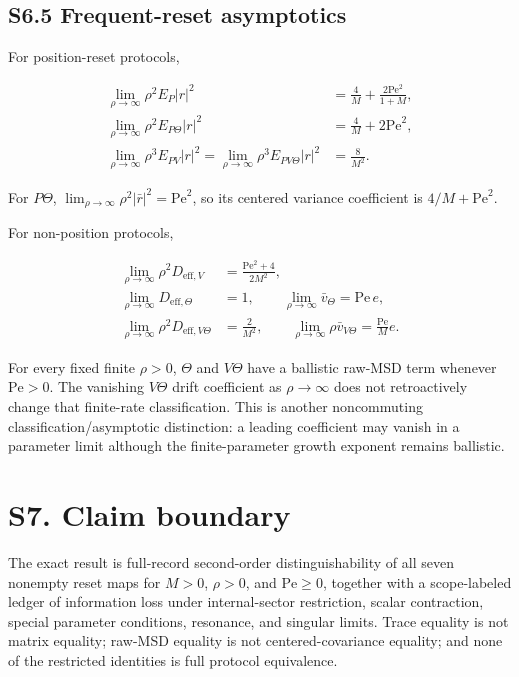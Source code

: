 \subsection{S6.5 Frequent-reset asymptotics}\label{s6.5-frequent-reset-asymptotics}

For position-reset protocols,

\[
\begin{aligned}
\lim_{\rho\to\infty}\rho^2E_P|r|^2
&=\frac4M+\frac{2\mathrm{Pe}^2}{1+M},\\
\lim_{\rho\to\infty}\rho^2E_{P\Theta}|r|^2
&=\frac4M+2\mathrm{Pe}^2,\\
\lim_{\rho\to\infty}\rho^3E_{PV}|r|^2
=\lim_{\rho\to\infty}\rho^3E_{PV\Theta}|r|^2
&=\frac8{M^2}.
\end{aligned}
\]

For \(P\Theta\), \(\lim_{\rho\to\infty}\rho^2|\bar r|^2=\mathrm{Pe}^2\), so its centered variance coefficient is \(4/M+\mathrm{Pe}^2\).

For non-position protocols,

\[
\begin{aligned}
\lim_{\rho\to\infty}\rho^2D_{\mathrm{eff},V}
&=\frac{\mathrm{Pe}^2+4}{2M^2},\\
\lim_{\rho\to\infty}D_{\mathrm{eff},\Theta}
&=1,\qquad
\lim_{\rho\to\infty}\bar v_\Theta=\mathrm{Pe}\,e,\\
\lim_{\rho\to\infty}\rho^2D_{\mathrm{eff},V\Theta}
&=\frac2{M^2},\qquad
\lim_{\rho\to\infty}\rho\bar v_{V\Theta}
=\frac{\mathrm{Pe}}{M}e.
\end{aligned}
\]

For every fixed finite \(\rho>0\), \(\Theta\) and \(V\Theta\) have a ballistic raw-MSD term whenever \(\mathrm{Pe}>0\). The vanishing \(V\Theta\) drift coefficient as \(\rho\to\infty\) does not retroactively change that finite-rate classification. This is another noncommuting classification/asymptotic distinction: a leading coefficient may vanish in a parameter limit although the finite-parameter growth exponent remains ballistic.

\section{S7. Claim boundary}\label{s7.-claim-boundary}

The exact result is full-record second-order distinguishability of all seven nonempty reset maps for \(M>0\), \(\rho>0\), and \(\mathrm{Pe}\ge0\), together with a scope-labeled ledger of information loss under internal-sector restriction, scalar contraction, special parameter conditions, resonance, and singular limits. Trace equality is not matrix equality; raw-MSD equality is not centered-covariance equality; and none of the restricted identities is full protocol equivalence.

